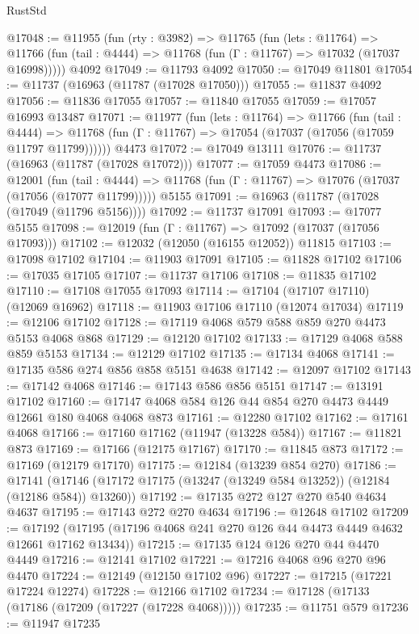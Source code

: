 \begin{lexlean}{RustStd}
\begin{coremodule}
@17048 := @11955
    (fun (rty : @3982) =>
    @11765
      (fun (lets : @11764) =>
      @11766 (fun (tail : @4444) => @11768 (fun (Γ : @11767) => @17032 (@17037 @16998)))))
    @4092
@17049 := @11793 @4092
@17050 := @17049 @11801
@17054 := @11737 (@16963 (@11787 (@17028 @17050)))
@17055 := @11837 @4092
@17056 := @11836 @17055
@17057 := @11840 @17055
@17059 := @17057 @16993 @13487
@17071 := @11977
    (fun (lets : @11764) =>
    @11766
      (fun (tail : @4444) =>
      @11768 (fun (Γ : @11767) => @17054 (@17037 (@17056 (@17059 @11797 @11799))))))
    @4473
@17072 := @17049 @13111
@17076 := @11737 (@16963 (@11787 (@17028 @17072)))
@17077 := @17059 @4473
@17086 := @12001
    (fun (tail : @4444) => @11768 (fun (Γ : @11767) => @17076 (@17037 (@17056 (@17077 @11799)))))
    @5155
@17091 := @16963 (@11787 (@17028 (@17049 (@11796 @5156))))
@17092 := @11737 @17091
@17093 := @17077 @5155
@17098 := @12019 (fun (Γ : @11767) => @17092 (@17037 (@17056 @17093)))
@17102 := @12032 (@12050 (@16155 @12052)) @11815
@17103 := @17098 @17102
@17104 := @11903 @17091
@17105 := @11828 @17102
@17106 := @17035 @17105
@17107 := @11737 @17106
@17108 := @11835 @17102
@17110 := @17108 @17055 @17093
@17114 := @17104 (@17107 @17110) (@12069 @16962)
@17118 := @11903 @17106 @17110 (@12074 @17034)
@17119 := @12106 @17102
@17128 := @17119 @4068 @579 @588 @859 @270 @4473 @5153 @4068 @868
@17129 := @12120 @17102
@17133 := @17129 @4068 @588 @859 @5153
@17134 := @12129 @17102
@17135 := @17134 @4068
@17141 := @17135 @586 @274 @856 @858 @5151 @4638
@17142 := @12097 @17102
@17143 := @17142 @4068
@17146 := @17143 @586 @856 @5151
@17147 := @13191 @17102
@17160 := @17147 @4068 @584 @126 @44 @854 @270 @4473 @4449 @12661 @180 @4068 @4068 @873
@17161 := @12280 @17102
@17162 := @17161 @4068
@17166 := @17160 @17162 (@11947 (@13228 @584))
@17167 := @11821 @873
@17169 := @17166 (@12175 @17167)
@17170 := @11845 @873
@17172 := @17169 (@12179 @17170)
@17175 := @12184 (@13239 @854 @270)
@17186 := @17141
    (@17146 (@17172 @17175 (@13247 (@13249 @584 @13252)) (@12184 (@12186 @584)) @13260))
@17192 := @17135 @272 @127 @270 @540 @4634 @4637
@17195 := @17143 @272 @270 @4634
@17196 := @12648 @17102
@17209 := @17192 (@17195 (@17196 @4068 @241 @270 @126 @44 @4473 @4449 @4632 @12661 @17162 @13434))
@17215 := @17135 @124 @126 @270 @44 @4470 @4449
@17216 := @12141 @17102
@17221 := @17216 @4068 @96 @270 @96 @4470
@17224 := @12149 (@12150 @17102 @96)
@17227 := @17215 (@17221 @17224 @12274)
@17228 := @12166 @17102
@17234 := @17128 (@17133 (@17186 (@17209 (@17227 (@17228 @4068)))))
@17235 := @11751 @579
@17236 := @11947 @17235

\end{coremodule}
\end{lexlean}
